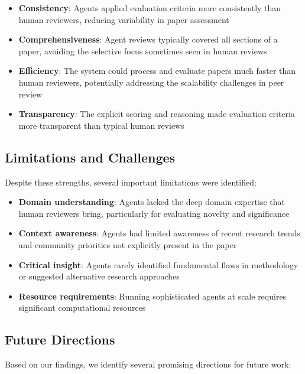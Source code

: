 \documentclass[conference]{IEEEtran}
\begin{document}
\begin{itemize}
    \item \textbf{Consistency}: Agents applied evaluation criteria more consistently than human reviewers, reducing variability in paper assessment
    
    \item \textbf{Comprehensiveness}: Agent reviews typically covered all sections of a paper, avoiding the selective focus sometimes seen in human reviews
    
    \item \textbf{Efficiency}: The system could process and evaluate papers much faster than human reviewers, potentially addressing the scalability challenges in peer review
    
    \item \textbf{Transparency}: The explicit scoring and reasoning made evaluation criteria more transparent than typical human reviews
\end{itemize}

\subsection{Limitations and Challenges}
Despite these strengths, several important limitations were identified:

\begin{itemize}
    \item \textbf{Domain understanding}: Agents lacked the deep domain expertise that human reviewers bring, particularly for evaluating novelty and significance
    
    \item \textbf{Context awareness}: Agents had limited awareness of recent research trends and community priorities not explicitly present in the paper
    
    \item \textbf{Critical insight}: Agents rarely identified fundamental flaws in methodology or suggested alternative research approaches
    
    \item \textbf{Resource requirements}: Running sophisticated agents at scale requires significant computational resources
\end{itemize}

\subsection{Future Directions}
Based on our findings, we identify several promising directions for future work:
\end{document}
